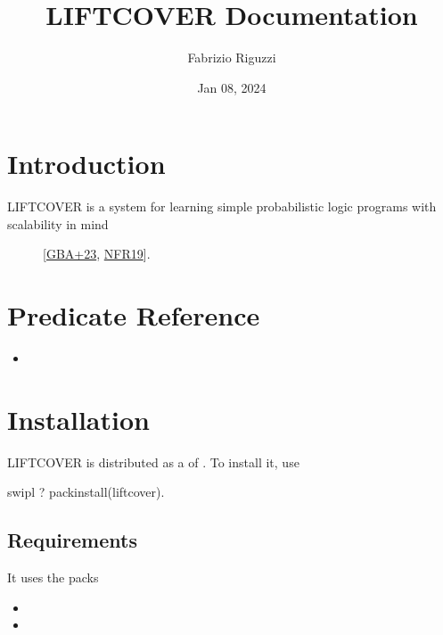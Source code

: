 \documentclass[letterpaper,10pt,english]{sphinxmanual}
\title{LIFTCOVER Documentation}
\date{Jan 08, 2024}
\author{Fabrizio Riguzzi}
\begin{document}
\pagestyle{empty}
\sphinxmaketitle
\pagestyle{plain}
\sphinxtableofcontents
\pagestyle{normal}
\label{\detokenize{index::doc}}



\chapter{Introduction}
\label{\detokenize{index:introduction}}\begin{description}
\item[{LIFTCOVER is a system for learning simple probabilistic logic programs with scalability in mind}] \leavevmode
\sphinxAtStartPar
{[}\hyperlink{cite.index:id7}{GBA+23}, \hyperlink{cite.index:id34}{NFR19}{]}.

\end{description}


\chapter{Predicate Reference}
\label{\detokenize{index:predicate-reference}}\begin{itemize}
\item {} 
\sphinxAtStartPar
{}

\end{itemize}


\chapter{Installation}
\label{\detokenize{index:installation}}
\sphinxAtStartPar
LIFTCOVER is distributed as a  of .
To install it, use

\begin{sphinxVerbatim}[commandchars=\\\{\}]
\PYGZdl{} swipl
?\PYGZhy{} pack\PYGZus{}install(liftcover).
\end{sphinxVerbatim}


\section{Requirements}
\label{\detokenize{index:requirements}}
\sphinxAtStartPar
It uses the packs
\begin{itemize}
\item {} 
\sphinxAtStartPar
{}

\item {} 
\sphinxAtStartPar
{}

\end{itemize}
\end{document}
